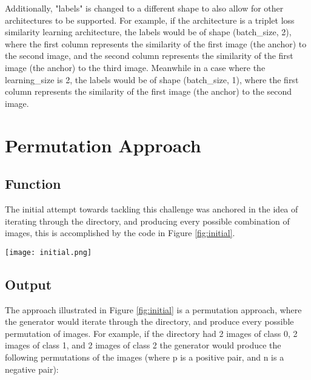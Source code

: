 \documentclass[
	letterpaper, %
	10pt, %
	unnumberedsections, %
	twoside, %
]{LTJournalArticle}
\begin{document}
Additionally, "labels" is changed to a different shape to also allow for other architectures to be supported. For example, if the architecture is a triplet loss similarity learning architecture, the labels would be of shape (batch\_size, 2), where the first column represents the similarity of the first image (the anchor) to the second image, and the second column represents the similarity of the first image (the anchor) to the third image. Meanwhile in a case where the learning\_size is 2, the labels would be of shape (batch\_size, 1), where the first column represents the similarity of the first image (the anchor) to the second image.

\section{Permutation Approach}
\subsection{Function}
The initial attempt towards tackling this challenge was anchored in the idea of iterating through the directory, and producing every possible combination of images, this is accomplished by the code in Figure \ref{fig:initial}.

\begin{figure*} %
	\texttt{[image: initial.png]}
	\caption{The initial Python code for developing a generator for Siamese Neural Networks.}
	\label{fig:initial}
\end{figure*}

\subsection{Output}
The approach illustrated in Figure \ref{fig:initial} is a permutation approach, where the generator would iterate through the directory, and produce every possible permutation of images. For example, if the directory had 2 images of class 0, 2 images of class 1, and 2 images of class 2 the generator would produce the following permutations of the images (where p is a positive pair, and n is a negative pair):
\end{document}
